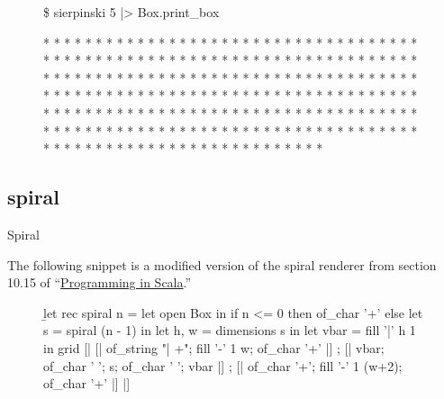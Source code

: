 \documentclass{article}
\begin{document}
\begin{figure}
\begin{code}[text]
\$ sierpinski 5 |> Box.print_box

                               *
                              * *
                             *   *
                            * * * *
                           *       *
                          * *     * *
                         *   *   *   *
                        * * * * * * * *
                       *               *
                      * *             * *
                     *   *           *   *
                    * * * *         * * * *
                   *       *       *       *
                  * *     * *     * *     * *
                 *   *   *   *   *   *   *   *
                * * * * * * * * * * * * * * * *
               *                               *
              * *                             * *
             *   *                           *   *
            * * * *                         * * * *
           *       *                       *       *
          * *     * *                     * *     * *
         *   *   *   *                   *   *   *   *
        * * * * * * * *                 * * * * * * * *
       *               *               *               *
      * *             * *             * *             * *
     *   *           *   *           *   *           *   *
    * * * *         * * * *         * * * *         * * * *
   *       *       *       *       *       *       *       *
  * *     * *     * *     * *     * *     * *     * *     * *
 *   *   *   *   *   *   *   *   *   *   *   *   *   *   *   *
* * * * * * * * * * * * * * * * * * * * * * * * * * * * * * * *
\end{code}
\end{figure}

\subsection{spiral}{Spiral}

The following snippet is a modified version of the spiral renderer from section 10.15 of ``\href{https://www.goodreads.com/book/show/5680904-programming-in-scala}{Programming in Scala}.''

\begin{figure}
\begin{code}[ocaml]
\b{let rec} spiral n =
    let open Box in
    if n <= 0
    then of_char '+'
    else let s = spiral (n - 1) in
         let h, w = dimensions s in
         let vbar = fill '|' h 1 in
         grid [| [| of_string "| +"; fill '-' 1 w; of_char '+' |]
               ; [| vbar; of_char ' '; s; of_char ' '; vbar |]
               ; [| of_char '+'; fill '-' 1 (w+2); of_char '+' |] |]
\end{code}
\end{figure}
\end{document}
